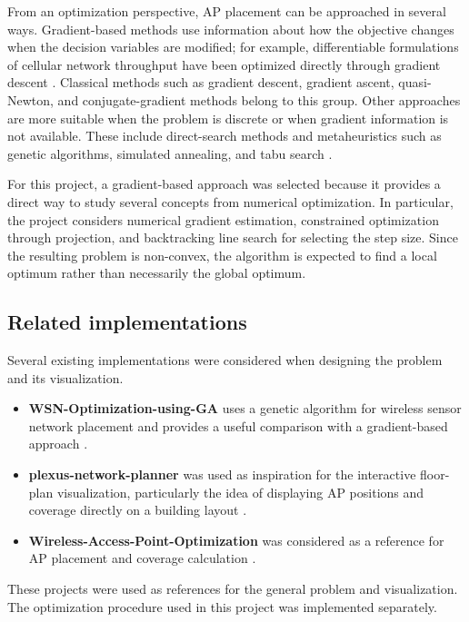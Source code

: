 \documentclass[11pt]{article}
\begin{document}
From an optimization perspective, AP placement can be approached in
several ways. Gradient-based methods use information about how the
objective changes when the decision variables are modified; for
example, differentiable formulations of cellular network throughput
have been optimized directly through gradient descent
\cite{eller2024differentiable}. Classical methods such as gradient
descent, gradient ascent, quasi-Newton, and conjugate-gradient methods
belong to this group. Other approaches are more suitable when the
problem is discrete or when gradient information is not available.
These include direct-search methods and metaheuristics such as
genetic algorithms, simulated annealing, and tabu search \cite{molina1999automatic}.

For this project, a gradient-based approach was selected because it
provides a direct way to study several concepts from numerical
optimization. In particular, the project considers numerical gradient
estimation, constrained optimization through projection, and
backtracking line search for selecting the step size. Since the
resulting problem is non-convex, the algorithm is expected to find a
local optimum rather than necessarily the global optimum.

\subsection{Related implementations}

Several existing implementations were considered when designing the
problem and its visualization.

\begin{itemize}
    \item \textbf{WSN-Optimization-using-GA} uses a genetic algorithm for wireless sensor network placement and
    provides a useful comparison with a gradient-based approach \cite{wsn_ga}.

    \item \textbf{plexus-network-planner}
    was used as inspiration for the interactive floor-plan
    visualization, particularly the idea of displaying AP positions
    and coverage directly on a building layout \cite{plexus_planner}.

    \item \textbf{Wireless-Access-Point-Optimization}
    was considered as a reference for AP placement and coverage
    calculation \cite{wap_optimization}.
\end{itemize}

These projects were used as references for the general problem and
visualization. The optimization procedure used in this project was
implemented separately.
\end{document}
